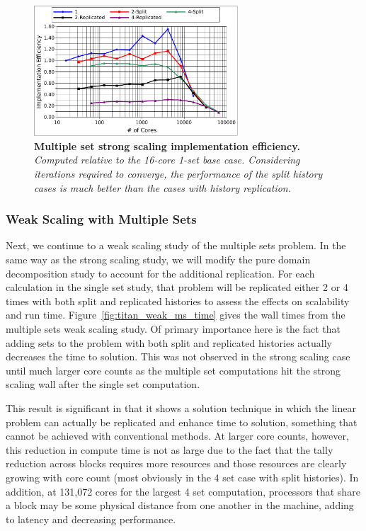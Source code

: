 \documentclass{snamc2013}
\begin{document}
\begin{figure}[h!]
  \begin{center}
    \includegraphics[width=3in]{titan_strong_ms_impeff.pdf}
  \end{center}
  \caption{\textbf{Multiple set strong scaling implementation
      efficiency.} \textit{Computed relative to the 16-core 1-set base
      case. Considering iterations required to converge, the
      performance of the split history cases is much better than the
      cases with history replication.}}
  \label{fig:titan_strong_ms_impeff}
\end{figure}

\subsubsection{Weak Scaling with Multiple Sets}
\label{subsubsec:ms_weak}

Next, we continue to a weak scaling study of the multiple sets
problem. In the same way as the strong scaling study, we will modify
the pure domain decomposition study to account for the additional
replication. For each calculation in the single set study, that
problem will be replicated either 2 or 4 times with both split and
replicated histories to assess the effects on scalability and
run time. Figure~\ref{fig:titan_weak_ms_time} gives the wall times from
the multiple sets weak scaling study. Of primary importance here is
the fact that adding sets to the problem with both split and
replicated histories actually decreases the time to solution. This was
not observed in the strong scaling case until much larger core counts
as the multiple set computations hit the strong scaling wall after the
single set computation.

This result is significant in that it shows a solution technique in
which the linear problem can actually be replicated and enhance time
to solution, something that cannot be achieved with conventional
methods. At larger core counts, however, this reduction in compute
time is not as large due to the fact that the tally reduction across
blocks requires more resources and those resources are clearly growing
with core count (most obviously in the 4 set case with split
histories). In addition, at 131,072 cores for the largest 4 set
computation, processors that share a block may be some physical
distance from one another in the machine, adding to latency and
decreasing performance.
\end{document}
